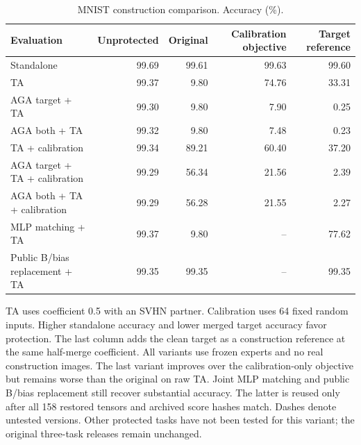 \begin{table}[t]
\centering\small
\caption{MNIST construction comparison. Accuracy (\%).}
\label{tab:calibrated-objective}
\begin{tabular}{lrrrr}
\toprule
Evaluation & Unprotected & Original & Calibration objective & Target reference \\
\midrule
Standalone & 99.69 & 99.61 & 99.63 & 99.60 \\
TA & 99.37 & 9.80 & 74.76 & 33.31 \\
AGA target + TA & 99.30 & 9.80 & 7.90 & 0.25 \\
AGA both + TA & 99.32 & 9.80 & 7.48 & 0.23 \\
TA + calibration & 99.34 & 89.21 & 60.40 & 37.20 \\
AGA target + TA + calibration & 99.29 & 56.34 & 21.56 & 2.39 \\
AGA both + TA + calibration & 99.29 & 56.28 & 21.55 & 2.27 \\
MLP matching + TA & 99.37 & 9.80 & -- & 77.62 \\
Public B/bias replacement + TA & 99.35 & 99.35 & -- & 99.35 \\
\bottomrule
\end{tabular}
\par\smallskip
\begin{minipage}{\textwidth}\footnotesize TA uses coefficient 0.5 with an SVHN partner. Calibration uses 64 fixed random inputs. Higher standalone accuracy and lower merged target accuracy favor protection. The last column adds the clean target as a construction reference at the same half-merge coefficient. All variants use frozen experts and no real construction images. The last variant improves over the calibration-only objective but remains worse than the original on raw TA. Joint MLP matching and public B/bias replacement still recover substantial accuracy. The latter is reused only after all 158 restored tensors and archived score hashes match. Dashes denote untested versions. Other protected tasks have not been tested for this variant; the original three-task releases remain unchanged.\end{minipage}
\end{table}

